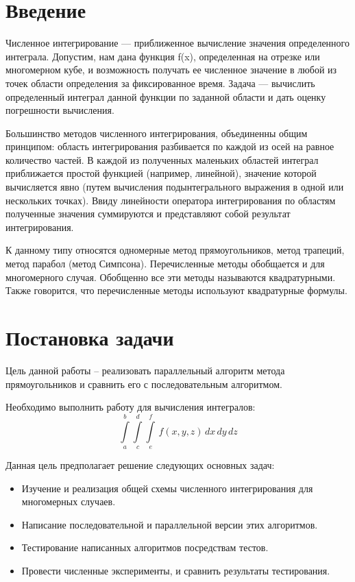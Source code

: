 \documentclass{report}
\begin{document}
\tableofcontents
\newpage

\section*{Введение}
Численное интегрирование — приближенное вычисление значения определенного интеграла. Допустим, нам дана функция f(x), определенная на отрезке или многомерном кубе, и возможность получать ее численное значение в любой из точек области определения за фиксированное время. Задача — вычислить определенный интеграл данной функции по заданной области и дать оценку погрешности вычисления.
\par Большинство методов численного интегрирования, объединенны общим принципом: область интегрирования разбивается по каждой из осей на равное количество частей. В каждой из полученных маленьких областей интеграл приближается простой функцией (например, линейной), значение которой вычисляется явно (путем вычисления подынтегрального выражения в одной или нескольких точках). Ввиду линейности оператора интегрирования по областям полученные значения суммируются и представляют собой результат интегрирования.
\par К данному типу относятся одномерные метод прямоугольников, метод трапеций, метод парабол (метод Симпсона). Перечисленные методы обобщается и для многомерного случая. Обобщенно все эти методы называются квадратурными. Также говорится, что перечисленные методы используют квадратурные формулы.
\newpage

\section*{Постановка задачи}
Цель данной работы – реализовать параллельный алгоритм метода прямоугольников и сравнить его с последовательным алгоритмом.
\par Необходимо выполнить работу для вычисления интегралов:
$$\int\limits_a^b 
\int\limits_c^d 
\int\limits_e^f \,f(x,y,z)\,dx\,dy\,dz
$$
\par Данная цель предполагает решение следующих основных задач:
\begin{itemize}
\item Изучение и реализация общей схемы численного интегрирования для многомерных случаев.
\item Написание последовательной и параллельной версии этих алгоритмов.
\item Тестирование написанных алгоритмов посредствам тестов.
\item Провести численные эксперименты, и сравнить результаты тестирования.
\end{itemize}
\newpage
\end{document}
